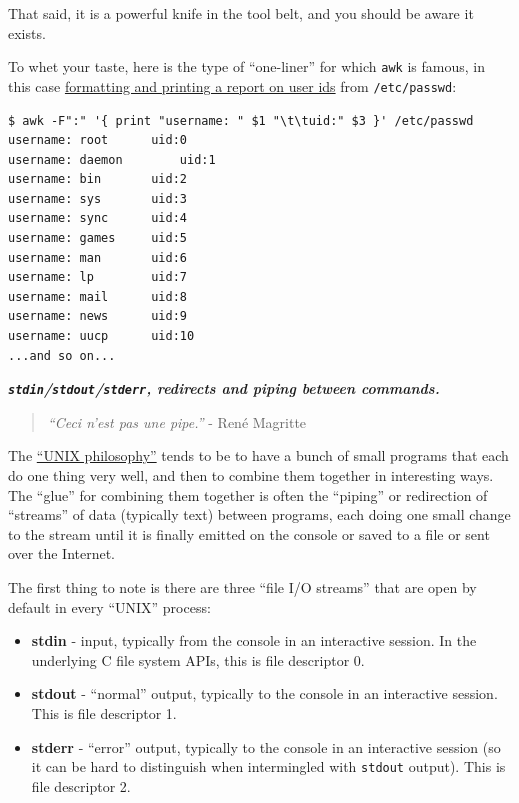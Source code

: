 \documentclass[10pt,]{book}
\numberwithin{figure}{chapter}
\begin{document}
That said, it is a powerful knife in the tool belt, and you should be
aware it exists.

To whet your taste, here is the type of ``one-liner'' for which
\texttt{awk} is famous, in this case
\href{http://www.ibm.com/developerworks/library/l-awk1/}{formatting and
printing a report on user ids} from \texttt{/etc/passwd}:

\begin{verbatim}
$ awk -F":" '{ print "username: " $1 "\t\tuid:" $3 }' /etc/passwd
username: root      uid:0
username: daemon        uid:1
username: bin       uid:2
username: sys       uid:3
username: sync      uid:4
username: games     uid:5
username: man       uid:6
username: lp        uid:7
username: mail      uid:8
username: news      uid:9
username: uucp      uid:10
...and so on...
\end{verbatim}


\textbf{\emph{\texttt{stdin}/\texttt{stdout}/\texttt{stderr}, redirects
and piping between commands.}}

\begin{quote}
\emph{``Ceci n'est pas une pipe.''} - René Magritte
\end{quote}

The \href{https://en.wikipedia.org/wiki/Unix_philosophy}{``UNIX
philosophy''} tends to be to have a bunch of small programs that each do
one thing very well, and then to combine them together in interesting
ways. The ``glue'' for combining them together is often the ``piping''
or redirection of ``streams'' of data (typically text) between programs,
each doing one small change to the stream until it is finally emitted on
the console or saved to a file or sent over the Internet.

The first thing to note is there are three ``file I/O streams'' that are
open by default in every ``UNIX'' process:

\begin{itemize}
\item
  \textbf{stdin} - input, typically from the console in an interactive
  session. In the underlying C file system APIs, this is file descriptor
  0.
\item
  \textbf{stdout} - ``normal'' output, typically to the console in an
  interactive session. This is file descriptor 1.
\item
  \textbf{stderr} - ``error'' output, typically to the console in an
  interactive session (so it can be hard to distinguish when
  intermingled with \texttt{stdout} output). This is file descriptor 2.
\end{itemize}
\end{document}
